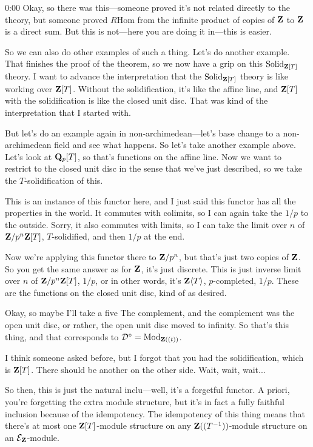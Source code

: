 \begin{unfinished}{0:00}
Okay, so there was this---someone proved it's not related directly to the theory, but someone proved $R\mathrm{Hom}$ from the infinite product of copies of $\mathbf Z$ to $\mathbf Z$ is a direct sum. But this is not---here you are doing it in---this is easier.

So we can also do other examples of such a thing. Let's do another example. That finishes the proof of the theorem, so we now have a grip on this $\mathrm{Solid}_{\mathbf Z[T]}$ theory. I want to advance the interpretation that the $\mathrm{Solid}_{\mathbf Z[T]}$ theory is like working over $\mathbf Z[T]$. Without the solidification, it's like the affine line, and $\mathbf Z[T]$ with the solidification is like the closed unit disc. That was kind of the interpretation that I started with.

But let's do an example again in non-archimedean---let's base change to a non-archimedean field and see what happens. So let's take another example above. Let's look at $\mathbf Q_p[T]$, so that's functions on the affine line. Now we want to restrict to the closed unit disc in the sense that we've just described, so we take the $T$-solidification of this.

This is an instance of this functor here, and I just said this functor has all the properties in the world. It commutes with colimits, so I can again take the $1/p$ to the outside. Sorry, it also commutes with limits, so I can take the limit over $n$ of $\mathbf Z/p^n\mathbf Z[T]$, $T$-solidified, and then $1/p$ at the end.

Now we're applying this functor there to $\mathbf Z/p^n$, but that's just two copies of $\mathbf Z$. So you get the same answer as for $\mathbf Z$, it's just discrete. This is just inverse limit over $n$ of $\mathbf Z/p^n\mathbf Z[T]$, $1/p$, or in other words, it's $\mathbf Z\langle T\rangle$, $p$-completed, $1/p$. These are the functions on the closed unit disc, kind of as desired.

Okay, so maybe I'll take a five
The complement, and the complement was the open unit disc, or rather, the open unit disc moved to infinity. So that's this thing, and that corresponds to $\mathcal{D}^\circ = \mathrm{Mod}_{\mathbf Z((t))}$.

I think someone asked before, but I forgot that you had the solidification, which is $\mathbf Z[T]$. There should be another on the other side. Wait, wait, wait...

So then, this is just the natural inclu---well, it's a forgetful functor. A priori, you're forgetting the extra module structure, but it's in fact a fully faithful inclusion because of the idempotency. The idempotency of this thing means that there's at most one $\mathbf Z[T]$-module structure on any $\mathbf Z((T^{-1}))$-module structure on an $\mathcal{E}_\mathbf Z$-module.


\end{unfinished}
